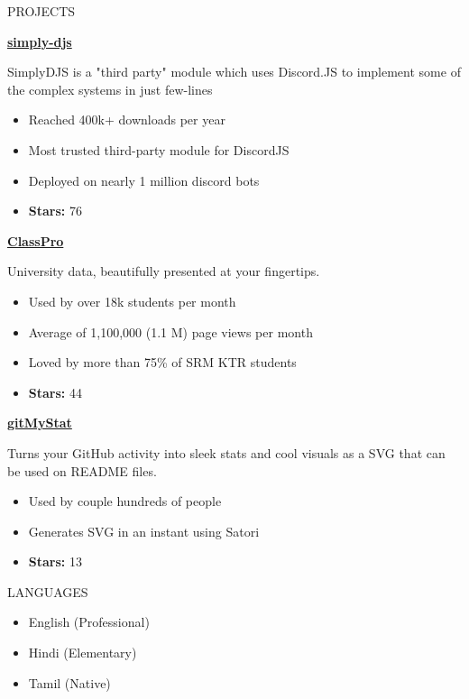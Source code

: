 \documentclass{resume}
\begin{document}
\begin{rSection}{PROJECTS}    
    \item \textbf{\href{https://github.com/Rahuletto/simply-djs}{simply-djs}}

SimplyDJS is a "third party" module which uses Discord.JS to implement some of the complex
systems in just few-lines

\begin{itemize}
\item Reached 400k+ downloads per year
\item Most trusted third-party module for DiscordJS
\item Deployed on nearly 1 million discord bots
\item \textbf{Stars:} 76
\end{itemize}
\item \textbf{\href{https://github.com/Rahuletto/ClassPro}{ClassPro}}

University data, beautifully presented at your fingertips.

\begin{itemize}
\item Used by over 18k students per month
\item Average of 1,100,000 (1.1 M) page views per month
\item Loved by more than 75\% of SRM KTR students
\item \textbf{Stars:} 44
\end{itemize}
\item \textbf{\href{https://github.com/Rahuletto/gitMyStat}{gitMyStat}}

Turns your GitHub activity into sleek stats and cool visuals as a SVG that can be used on README files.

\begin{itemize}
\item Used by couple hundreds of people
\item Generates SVG in an instant using Satori
\item \textbf{Stars:} 13
\end{itemize}

\end{rSection}
\vspace{1.5em}


\begin{rSection}{LANGUAGES}

\begin{itemize}
    \item English (Professional)
\item Hindi (Elementary)
\item Tamil (Native)

\end{itemize}

\end{rSection}
\end{document}
